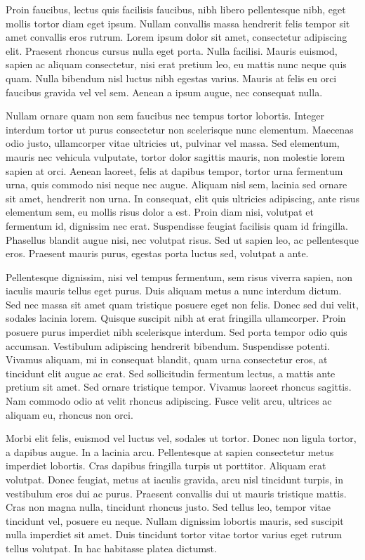 \documentclass[12pt]{report}
\begin{document}
\begin{large}
Proin faucibus, lectus quis facilisis faucibus, nibh libero
pellentesque nibh, eget mollis tortor diam eget ipsum. Nullam
convallis massa hendrerit felis tempor sit amet convallis eros rutrum.
Lorem ipsum dolor sit amet, consectetur adipiscing elit. Praesent
rhoncus cursus nulla eget porta. Nulla facilisi. Mauris euismod,
sapien ac aliquam consectetur, nisi erat pretium leo, eu mattis nunc
neque quis quam. Nulla bibendum nisl luctus nibh egestas varius.
Mauris at felis eu orci faucibus gravida vel vel sem. Aenean a ipsum
augue, nec consequat nulla.

Nullam ornare quam non sem faucibus nec tempus tortor lobortis.
Integer interdum tortor ut purus consectetur non scelerisque nunc
elementum. Maecenas odio justo, ullamcorper vitae ultricies ut,
pulvinar vel massa. Sed elementum, mauris nec vehicula vulputate,
tortor dolor sagittis mauris, non molestie lorem sapien at orci.
Aenean laoreet, felis at dapibus tempor, tortor urna fermentum urna,
quis commodo nisi neque nec augue. Aliquam nisl sem, lacinia sed
ornare sit amet, hendrerit non urna. In consequat, elit quis ultricies
adipiscing, ante risus elementum sem, eu mollis risus dolor a est.
Proin diam nisi, volutpat et fermentum id, dignissim nec erat.
Suspendisse feugiat facilisis quam id fringilla. Phasellus blandit
augue nisi, nec volutpat risus. Sed ut sapien leo, ac pellentesque
eros. Praesent mauris purus, egestas porta luctus sed, volutpat a
ante.

Pellentesque dignissim, nisi vel tempus fermentum, sem risus viverra
sapien, non iaculis mauris tellus eget purus. Duis aliquam metus a
nunc interdum dictum. Sed nec massa sit amet quam tristique posuere
eget non felis. Donec sed dui velit, sodales lacinia lorem. Quisque
suscipit nibh at erat fringilla ullamcorper. Proin posuere purus
imperdiet nibh scelerisque interdum. Sed porta tempor odio quis
accumsan. Vestibulum adipiscing hendrerit bibendum. Suspendisse
potenti. Vivamus aliquam, mi in consequat blandit, quam urna
consectetur eros, at tincidunt elit augue ac erat. Sed sollicitudin
fermentum lectus, a mattis ante pretium sit amet. Sed ornare tristique
tempor. Vivamus laoreet rhoncus sagittis. Nam commodo odio at velit
rhoncus adipiscing. Fusce velit arcu, ultrices ac aliquam eu, rhoncus
non orci.

Morbi elit felis, euismod vel luctus vel, sodales ut tortor. Donec non
ligula tortor, a dapibus augue. In a lacinia arcu. Pellentesque at
sapien consectetur metus imperdiet lobortis. Cras dapibus fringilla
turpis ut porttitor. Aliquam erat volutpat. Donec feugiat, metus at
iaculis gravida, arcu nisl tincidunt turpis, in vestibulum eros dui ac
purus. Praesent convallis dui ut mauris tristique mattis. Cras non
magna nulla, tincidunt rhoncus justo. Sed tellus leo, tempor vitae
tincidunt vel, posuere eu neque. Nullam dignissim lobortis mauris, sed
suscipit nulla imperdiet sit amet. Duis tincidunt tortor vitae tortor
varius eget rutrum tellus volutpat. In hac habitasse platea dictumst.


\end{large}
\end{document}
